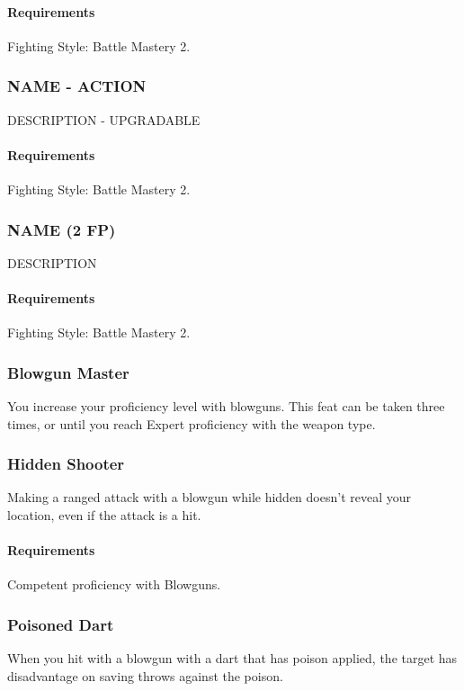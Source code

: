     \paragraph{Requirements} Fighting Style: Battle Mastery 2.
\subsubsection{NAME - ACTION} \label{feat::name}
    DESCRIPTION - UPGRADABLE
    \paragraph{Requirements} Fighting Style: Battle Mastery 2.
\subsubsection{NAME (2 FP)} \label{feat::name}
    DESCRIPTION
    \paragraph{Requirements} Fighting Style: Battle Mastery 2.

\subsubsection{Blowgun Master} \label{feat::blowgunmaster}
    You increase your proficiency level with blowguns.
    This feat can be taken three times, or until you reach Expert proficiency with the weapon type.
\subsubsection{Hidden Shooter} \label{feat::hiddenshooter}
    Making a ranged attack with a blowgun while hidden doesn't reveal your location, even if the attack is a hit.
    \paragraph{Requirements} Competent proficiency with Blowguns.
\subsubsection{Poisoned Dart} \label{feat::poisoneddart}
    When you hit with a blowgun with a dart that has poison applied, the target has disadvantage on saving throws against the poison.
